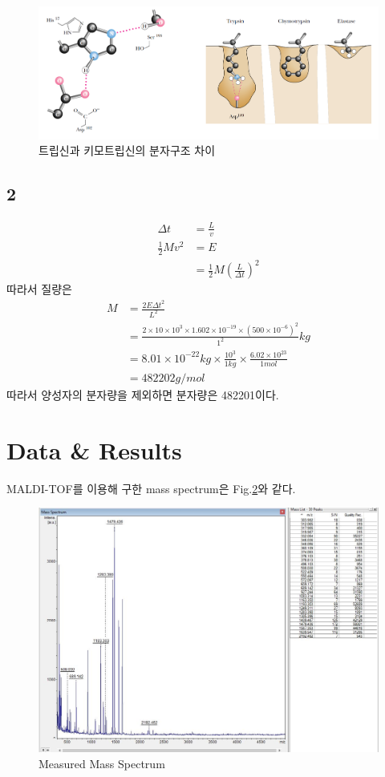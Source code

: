 \documentclass[%
 reprint,
 amsmath,amssymb,
 aps,
]{revtex4-2}
\begin{document}
\begin{figure}[htbp]
	\includegraphics[width = 0.9\linewidth]{molecule.png}%
	\caption{\label{fig:molecule}트립신과 키모트립신의 분자구조 차이}
\end{figure}

\subsection{\label{sec:level2} 2}
\begin{align}
	\Delta t &= \frac{L}{v}\\
	\frac{1}{2}Mv^{2} &= E\\
	&= \frac{1}{2}M\left( \frac{L}{\Delta t} \right)^{2}
\end{align}
따라서 질량은
\begin{align}
	M &= \frac{2E\Delta t^{2}}{L^{2}}\\
	&=\frac{2\times 10 \times 10^{3} \times 1.602\times10^{-19}\times (500\times10^{-6})^2}{1^{2}}kg\\
	&=8.01\times10^{-22}kg \times \frac{10^{3}}{1kg} \times \frac{6.02\times10^{23}}{1mol}\\
	&= 482202 g/mol
\end{align}
따라서 양성자의 분자량을 제외하면 분자량은 482201이다.

\section{\label{sec:level1}Data \& Results}
MALDI-TOF를 이용해 구한 mass spectrum은 Fig.\ref{fig:DATA}와 같다.

\begin{figure}[htbp]
	\includegraphics[width = 0.9\linewidth]{DATA.png}%
	\caption{\label{fig:DATA}Measured Mass Spectrum}
\end{figure}
\end{document}
